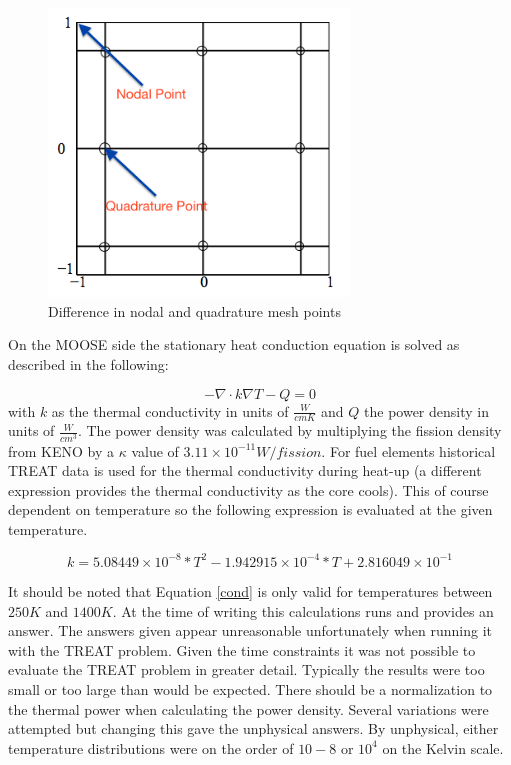\documentclass[11pt]{article}
\begin{document}
\begin{figure}[h]
    \centering
    \includegraphics[width=8cm]{figures/nodalvsquad.png}
    \caption{Difference in nodal and quadrature mesh points}
    \label{fig:nodalquad}
\end{figure}

On the MOOSE side the stationary heat conduction equation is solved as described in the following:

\begin{equation}
    -\nabla \cdot k\nabla T - Q = 0
\end{equation}
with $k$ as the thermal conductivity in units of $\frac{W}{cm K}$  and $Q$ the power density in units of $\frac{W}{cm^3}$. The power density was calculated by multiplying the fission density from KENO by a $\kappa$ value of $3.11 \times 10^{-11} W/fission$. For fuel elements historical TREAT data is used for the thermal conductivity during heat-up (a different expression provides the thermal conductivity as the core cools).  This of course dependent on temperature so the following expression is evaluated at the given temperature.

\begin{equation}
    k = 5.08449 \times 10^{-8} * T^2 - 1.942915 \times 10^{-4} * T + 2.816049 \times 10^{-1}
    \label{cond}
\end{equation}

It should be noted that Equation \ref{cond} is only valid for temperatures between $250K$ and $1400K$.
At the time of writing this calculations runs and provides an answer.  The answers given appear unreasonable unfortunately when running it with the TREAT problem.  Given the time constraints it was not possible to evaluate the TREAT problem in greater detail.  Typically the results were too small or too large than would be expected.  There should be a normalization to the thermal power when calculating the power density.  Several variations were attempted but changing this gave the unphysical answers.  By unphysical, either temperature distributions were on the order of $10-8$ or $10^4$ on the Kelvin scale. 
\end{document}
